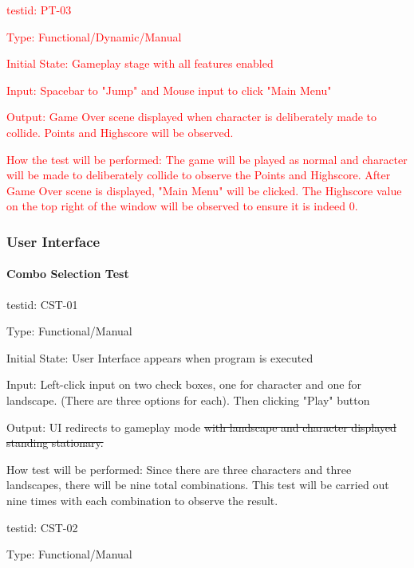 \documentclass[12pt, titlepage]{article}
\begin{document}
\begin{enumerate}
\textcolor{red}{\item{testid: PT-03}}

\textcolor{red}{Type: Functional/Dynamic/Manual}

\textcolor{red}{Initial State: Gameplay stage with all features enabled}

\textcolor{red}{Input: Spacebar to "Jump" and Mouse input to click "Main Menu"}

\textcolor{red}{Output: Game Over scene displayed when character is deliberately made to collide. Points and Highscore will be observed.}

\textcolor{red}{How the test will be performed: The game will be played as normal and character will be made to deliberately collide to observe the Points and Highscore. After Game Over scene is displayed, "Main Menu" will be clicked. The Highscore value on the top right of the window will be observed to ensure it is indeed 0.}

\subsubsection{User Interface}

\paragraph{Combo Selection Test}

\item{testid: CST-01\\}

Type: Functional/Manual
					
Initial State: User Interface appears when program is executed
					
Input: Left-click input on two check boxes, one for character and one for landscape. (There are three options for each). Then clicking "Play" button
					
Output: UI redirects to gameplay mode \sout{with landscape and character displayed standing stationary.}
					
How test will be performed: Since there are three characters and three landscapes, there will be nine total combinations. This test will be carried out nine times with each combination to observe the result.\\

\item{testid: CST-02\\}

Type: Functional/Manual
					

\end{enumerate}
\end{document}
